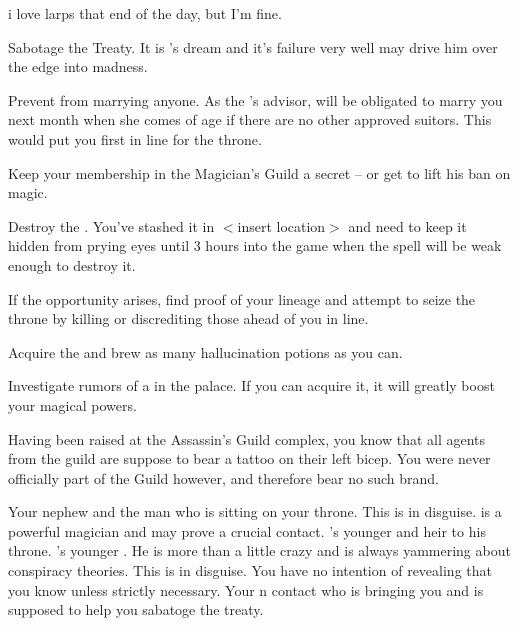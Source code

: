 i love larps that end of the day, but I'm fine.\documentclass[char]{NeptuneBall}
\begin{document}
\begin{itemz}[Goals]
  \item Sabotage the Treaty. It is \cKing{}'s dream and it's failure very well may drive him over the edge into madness.
  \item Prevent \cPrincess{} from marrying anyone. As the \cKing{\King}'s advisor, \cPrincess{\they} will be obligated to marry you next month when she comes of age if there are no other approved suitors. This would put you first in line for the throne.
  \item Keep your membership in the Magician's Guild a secret -- or get \cKing{\King} \cKing{} to lift his ban on magic.
  \item Destroy the \iMusicBox{}. You've stashed it in $<$insert location$>$ and need to keep it hidden from prying eyes until 3 hours into the game when the spell will be weak enough to destroy it.
  \item If the opportunity arises, find proof of your lineage and attempt to seize the throne by killing or discrediting those ahead of you in line.
  \item Acquire the \iHemlock{} and brew as many hallucination potions as you can.
  \item Investigate rumors of a \iGlowShell{\MYname} in the palace. If you can acquire it, it will greatly boost your magical powers.
\end{itemz}

\begin{itemz}[Notes]
  \item Having been raised at the Assassin's Guild complex, you know that all agents from the guild are suppose to bear a tattoo on their left bicep. You were never officially part of the Guild however, and therefore bear no such brand.
\end{itemz}

\begin{contacts}
  \contact{\cKing{}} Your nephew and the man who is sitting on your throne.
  \contact{\cWitch{\MYname}} This is \cWitch{} in disguise. \cWitch{\They} is a powerful magician and may prove a crucial contact.
  \contact{\cPrincess{}} \cKing{}'s younger \cPrincess{\offspring} and heir to his throne.
  \contact{\cPlant{}} \cKing{}'s younger \cPlant{\sibling}. He is more than a little crazy and is always yammering about conspiracy theories.
  \contact{\cQueen{\MYname}} This is \cQueen{} in disguise. You have no intention of revealing that you know \cQueen{\them} unless strictly necessary.
  \contact{\cSpy{}} Your \pPacifica{}n contact who is bringing you \iHemlock{} and is supposed to help you sabatoge the treaty.
\end{contacts}
\end{document}

